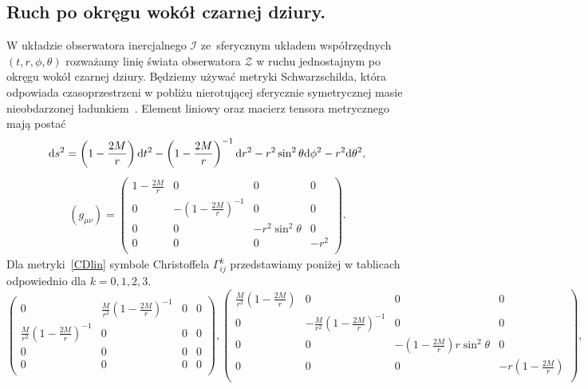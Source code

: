 \subsection{Ruch po okręgu wokół czarnej dziury.}
W układzie obserwatora inercjalnego $\mathcal{I}$ ze~sferycznym układem
współrzędnych $(t,r,\phi,\theta)$ rozważamy linię świata 
obserwatora $\mathcal{Z}$ w ruchu jednostajnym po okręgu wokół czarnej dziury.
Będziemy używać metryki Schwarzschilda, która odpowiada 
czasoprzestrzeni w pobliżu nierotującej sferycznie symetrycznej masie 
nieobdarzonej ładunkiem~\cite{hartle2016}. 
Element liniowy oraz macierz tensora metrycznego mają postać
\begin{align} \label{CDlin}
\text{d} s^2 = 
 \left(1-\frac{2 M}{r}\right) \text{d} t^2 
 -\left(1-\frac{2 M}{r}\right)^{-1} \text{d} r^2 
 -r^2 \sin ^2\theta\text{d} \phi^2 
 -r^2 \text{d} \theta^2,
\end{align}
\begin{align}\nonumber
(g_{\mu\nu}) = \left(
\begin{array}{cccc}
 1-\frac{2 M}{r} & 0 & 0 & 0 \\
 0 & -\left(1-\frac{2 M}{r}\right)^{-1} & 0 & 0 \\
 0 & 0 & -r^2 \sin ^2\theta  & 0 \\
 0 & 0 & 0 & -r^2 \\
\end{array}
\right).
\end{align}
Dla metryki~\eqref{CDlin} symbole Christoffela $\Gamma^k _{ij}$ 
przedstawiamy poniżej w tablicach odpowiednio dla $k=0,1,2,3$.
$$
\left(
\begin{array}{cccc}
 0 & \frac{M}{r^2}\left( 1 - \frac{2M}{r}  \right)^{-1}& 0 & 0 \\
 \frac{M}{r^2}\left( 1 - \frac{2M}{r}  \right)^{-1} & 0 & 0 & 0 \\
 0 & 0 & 0 & 0 \\
 0 & 0 & 0 & 0 \\
\end{array}
\right),\left(
\begin{array}{cccc}
 \frac{M}{r^2}\left( 1 - \frac{2M}{r}  \right) & 0 & 0 & 0 \\
 0 &-\frac{M}{r^2}\left( 1 - \frac{2M}{r}  \right)^{-1} & 0 & 0 \\
 0 & 0 & -\left(1-\frac{2M}{r}\right)r \sin ^2\theta  & 0 \\
 0 & 0 & 0 & -r \left(1-\frac{2M}{r}\right) \\
\end{array}
\right),
$$
